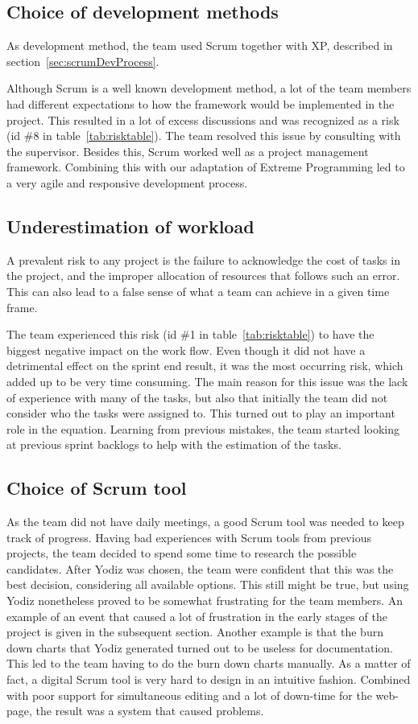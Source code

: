 \subsection{Choice of development methods}

As development method, the team used Scrum together with XP, described in section~\ref{sec:scrumDevProcess}. 

Although Scrum is a well known development method, a lot of the team members had different expectations to how the framework would be implemented in the project. This resulted in a lot of excess discussions and was recognized as a risk (id \#8 in table~\ref{tab:risktable}). The team resolved this issue by consulting with the supervisor. Besides this, Scrum worked well as a project management framework. Combining this with our adaptation of Extreme Programming led to a very agile and responsive development process.

\subsection{Underestimation of workload}
A prevalent risk to any project is the failure to acknowledge the cost of tasks in the project, and the improper allocation of resources that follows such an error. This can also lead to a false sense of what a team can achieve in a given time frame. 

The team experienced this risk (id \#1 in table~\ref{tab:risktable}) to have the biggest negative impact on the work flow. Even though it did not have a detrimental effect on the sprint end result, it was the most occurring risk, which added up to be very time consuming. The main reason for this issue was the lack of experience with many of the tasks, but also that initially the team did not consider who the tasks were assigned to. This turned out to play an important role in the equation. Learning from previous mistakes, the team started looking at previous sprint backlogs to help with the estimation of the tasks.

\subsection{Choice of Scrum tool}
\label{sec:choiceScrumTool}
As the team did not have daily meetings, a good Scrum tool was needed to keep track of progress. Having bad experiences with Scrum tools from previous projects, the team decided to spend some time to research the possible candidates. After Yodiz was chosen, the team were confident that this was the best decision, considering all available options. This still might be true, but using Yodiz nonetheless proved to be somewhat frustrating for the team members. An example of an event that caused a lot of frustration in the early stages of the project is given in the subsequent section. Another example is that the burn down charts that Yodiz generated turned out to be useless for documentation. This led to the team having to do the burn down charts manually. As a matter of fact, a digital Scrum tool is very hard to design in an intuitive fashion. Combined with poor support for simultaneous editing and a lot of down-time for the web-page, the result was a system that caused problems. 

